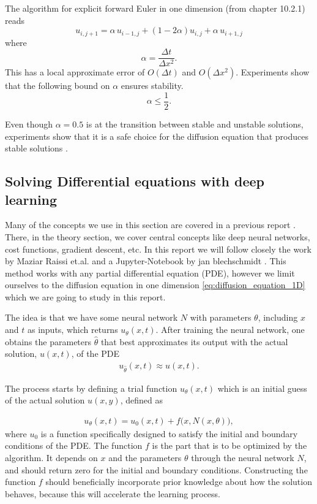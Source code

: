 \documentclass[12pt]{extarticle}
\begin{document}
The algorithm for explicit forward Euler in one dimension (from \cite{lectures2015} chapter 10.2.1) reads
\begin{equation}
\label{eq:forward_euler}
u_{i, j+1} = \alpha\, u_{i-1, j} + (1 - 2\alpha) u_{i,j} + \alpha\, u_{i+1, j}
\end{equation}
where
\begin{equation}
\alpha = \frac{\Delta t}{\Delta x^2}.
\end{equation}
This has a local approximate error of $O(\Delta t)$ and $O(\Delta x ^2)$. Experiments show that the following bound on $\alpha$ ensures stability.
\begin{equation}
	\label{eq:stability}
	\alpha \le \frac{1}{2}.
\end{equation} 

Even though $\alpha = 0.5$ is at the transition between stable and unstable solutions, experiments show that it is a safe choice for the diffusion equation that produces stable solutions \cite{Linge2017}. 

\subsection{Solving Differential equations with deep learning}
Many of the concepts we use in this section are covered in a previous report \cite{project2}. There, in the theory section, we cover central concepts like deep neural networks, cost functions, gradient descent, etc. In this report we will follow closely the work by Maziar Raissi et.al. \cite{raissi2017physics} and a Jupyter-Notebook by jan blechschmidt \cite{PINNjanblechschmidt}. This method works with any partial differential equation (PDE), however we limit ourselves to the diffusion equation in one dimension \eqref{eq:diffusion_equation_1D} which we are going to study in this report. 

The idea is that we have some neural network $N$ with parameters $\theta$, including $x$ and $t$ as inputs, which returns $u_{\theta}(x,t)$. After training the neural network, one obtains the parameters $\hat{\theta}$ that best approximates its output with the actual solution, $u(x,t)$, of the PDE
\begin{align}
	u_{\hat{\theta}} (x, t) \approx u(x, t).
\end{align}

The process starts by defining a trial function $u_{\theta}(x,t)$ which is an initial guess of the actual solution $u(x,y)$, defined as

\begin{align}
	u_{\theta}(x,t) = u_0(x, t) + f\big(x, N(x,\theta)\big),
	\label{eq:NN_model}
\end{align}
where $u_0$ is a function specifically designed to satisfy the initial and boundary conditions of the PDE. The function $f$ is the part that is to be optimized by the algorithm. It depends on $x$ and the parameters $\theta$ through the neural network $N$, and should return zero for the initial and boundary conditions. Constructing the function $f$ should beneficially incorporate prior knowledge about how the solution behaves, because this will accelerate the learning process.
\end{document}
